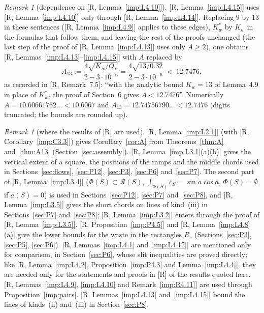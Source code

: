 \documentclass[11pt]{amsart}
\theoremstyle{definition}
\theoremstyle{remark}
\newtheorem{remark}[theorem]{Remark}
\numberwithin{equation}{section}
\begin{document}
\begin{remark}[dependence on {[R, Lemma~\ref{imp:L4.10}]}]
[R, Lemma~\ref{imp:L4.15}] uses [R, Lemma~\ref{imp:L4.10}] only through [R, Lemma~\ref{imp:L4.14}]. Replacing $9$ by
$13$ in these sentences ([R, Lemma~\ref{imp:L4.9}] applies to these edges), $K_w^*$ by $K_w$ in the formulas that follow
them, and leaving the rest of the proofs unchanged
(the last step of the proof of [R, Lemma~\ref{imp:L4.13}] uses only $A\ge2$), one obtains [R,
Lemmas~\ref{imp:L4.13}--\ref{imp:L4.15}] with $A$ replaced by
\[
A_{13}:=\frac{4\sqrt{K_w/Q_*}}{2-3\cdot10^{-6}}=\frac{4\sqrt{13/0.32}}{2-3\cdot10^{-6}}\ <\ 12.7476 ,
\]
as recorded in [R, Remark~7.5]: ``with the analytic bound $K_w=13$ of Lemma~4.9 in place of $K_w^*$, the proof of
Section~6 gives $A<12.7476$''. Numerically $A=10.60661762\ldots<10.6067$ and $A_{13}=12.74756790\ldots<12.7476$
(digits truncated; the bounds are rounded up).
\end{remark}

\begin{remark}[where the results of {[R]} are used]\label{rem:imp-uses}
[R, Lemma~\ref{imp:L2.1}] (with [R, Corollary~\ref{imp:C3.3}]) gives Corollary~\ref{cor:A} from Theorems~\ref{thm:A}
and~\ref{thm:A13} (Section~\ref{sec:assembly}). [R, Lemma~\ref{imp:L3.1}(a)(b)] gives the vertical extent of a square,
the positions of the ramps and the middle chords used in Sections~\ref{sec:flows}, \ref{sec:P12}, \ref{sec:P3},
\ref{sec:P6} and~\ref{sec:P7}. The second part of
[R, Lemma~\ref{imp:L3.4}] ($\Phi(S)\subset\mathcal R(S)$, $\int_{\Phi(S)}c_S=\sin a\cos a$, $\Phi(S)=\emptyset$ if $a(S)=0$)
is used in Sections~\ref{sec:P12}, \ref{sec:P7} and~\ref{sec:P8}, and [R, Lemma~\ref{imp:L3.5}] gives the short chords
on lines of kind~(iii) in Sections~\ref{sec:P7} and~\ref{sec:P8}; [R, Lemma~\ref{imp:L3.2}] enters through the proof
of [R, Lemma~\ref{imp:L3.5}].
[R, Proposition~\ref{imp:P4.5}] and [R, Lemma~\ref{imp:L4.8}(a)] give the lower bounds for the waste in the
rectangles $R_e$ (Sections~\ref{sec:P3}, \ref{sec:P5}, \ref{sec:P6}). [R, Lemmas~\ref{imp:L4.1} and~\ref{imp:L4.12}]
are mentioned only for comparison, in Section~\ref{sec:P6}, whose slit inequalities are proved directly; like
[R, Lemma~\ref{imp:L4.2}, Proposition~\ref{imp:P4.3} and Lemma~\ref{imp:L4.4}], they are needed only for the
statements and proofs in [R] of the results quoted here. [R, Lemmas~\ref{imp:L4.9}, \ref{imp:L4.10} and Remark~\ref{imp:R4.11}] are used through
Proposition~\ref{imp:pairs}. [R, Lemmas~\ref{imp:L4.13} and~\ref{imp:L4.15}] bound the lines of kinds~(ii) and~(iii) in
Section~\ref{sec:P8}.
\end{remark}
\end{document}
